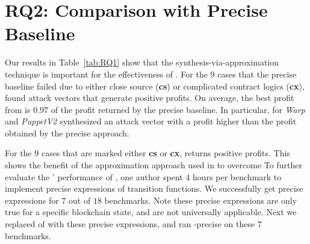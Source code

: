 \section{RQ2: Comparison with Precise Baseline}
Our results in Table~\ref{tab:RQ1} show that the synthesis-via-approximation
technique is important for the effectiveness of {\name}. For the $9$ cases that
the precise baseline failed due to either close source (\textbf{cs}) or
complicated contract logics (\textbf{cx}), {\name} found attack vectors that
generate positive profits. On average, the best profit from {\name} is $0.97$
of the profit returned by the precise baseline. In particular, for \emph{Warp} and \emph{PuppetV2}
{\name} synthesized an attack vector with a profit higher than the profit
obtained by the precise approach. 

For the $9$
cases that are marked either \textbf{cs} or \textbf{cx},  {\name} returns
positive profits. 
This shows the benefit of the approximation approach used in {\name} to overcome 
To further evaluate the {\approximators}' performance of {\name}, one author spent $4$ hours per benchmark 
to implement precise expressions of transition functions. We successfully get precise expressions 
for $7$ out of $18$ benchmarks. 
Note these precise expressions are only true for a specific blockchain 
state, and are not universally applicable. Next we replaced {\approximators} of 
{\name} with these precise expressions, and ran {\name}-precise on these $7$ benchmarks. 
 

